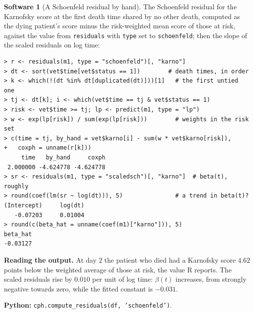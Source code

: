 \documentclass[11pt,a4paper]{article}
\numberwithin{equation}{section}
\theoremstyle{definition}
\newtheorem{software}[thm]{Software}
\begin{document}
\begin{software}[A Schoenfeld residual by hand]
\label{sw:schoen}
The Schoenfeld residual for the Karnofsky score at the first death time shared by no other death, computed as the dying patient's score minus the risk-weighted mean score of those at risk, against the value from \texttt{residuals} with \texttt{type} set to \texttt{schoenfeld}; then the slope of the scaled residuals on log time:
{\small\begin{verbatim}
> r <- residuals(m1, type = "schoenfeld")[, "karno"]
> dt <- sort(vet$time[vet$status == 1])        # death times, in order
> k <- which(!(dt %in% dt[duplicated(dt)]))[1]   # the first untied one
> tj <- dt[k]; i <- which(vet$time == tj & vet$status == 1)
> risk <- vet$time >= tj; lp <- predict(m1, type = "lp")
> w <- exp(lp[risk]) / sum(exp(lp[risk]))        # weights in the risk set
> c(time = tj, by_hand = vet$karno[i] - sum(w * vet$karno[risk]),
+   coxph = unname(r[k]))
     time   by_hand     coxph 
 2.000000 -4.624778 -4.624778 
> sr <- residuals(m1, type = "scaledsch")[, "karno"]  # beta(t), roughly
> round(coef(lm(sr ~ log(dt))), 5)               # a trend in beta(t)?
(Intercept)     log(dt) 
   -0.07203     0.01004 
> round(c(beta_hat = unname(coef(m1)["karno"])), 5)
beta_hat 
-0.03127 
\end{verbatim}}
\textbf{Reading the output.} At day $2$ the patient who died had a Karnofsky score $4.62$ points below the weighted average of those at risk, the value R reports. The scaled residuals rise by $0.010$ per unit of log time: $\beta(t)$ increases, from strongly negative towards zero, while the fitted constant is $-0.031$.

\textbf{Python:} \texttt{cph.compute\_residuals(df, 'schoenfeld')}.
\end{software}
\end{document}
